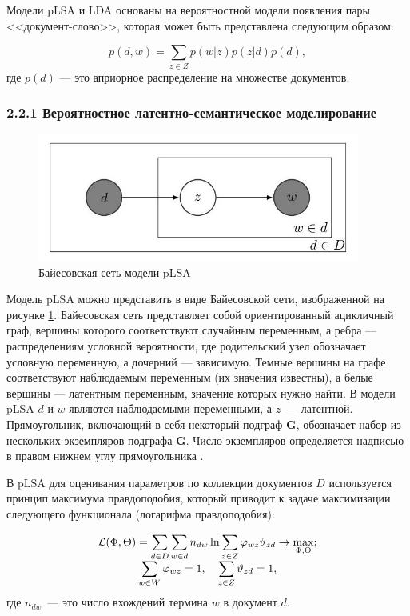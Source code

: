 \documentclass[a4paper]{report}
\begin{document}
	Модели pLSA и LDA основаны на вероятностной модели появления пары <<документ-слово>>,  которая может быть представлена следующим образом:
	
	\begin{equation}
	p(d,w) = \sum_{z \in Z}p(w|z) p(z|d) p(d),
	\label{eq:pmodel}
	\end{equation}
	где $p(d)$ --- это априорное распределение на множестве документов.
	
	
	
	
	
	\subsubsection{2.2.1 Вероятностное латентно-семантическое моделирование}
	\begin{figure}[h]
		\centering
		\includegraphics[width=400px]
		{imgs/PLSA.jpg}
		\caption{Байесовская сеть модели pLSA}
		\label{fig:plsa}
	\end{figure} 
	Модель pLSA можно представить в виде Байесовской сети, изображенной на рисунке \ref{fig:plsa}. Байесовская сеть представляет собой ориентированный ацикличный граф, вершины которого соответствуют случайным переменным, а ребра --- распределениям условной вероятности, где родительский узел обозначает условную переменную, а дочерний --- зависимую. Темные вершины на графе соответствуют наблюдаемым переменным (их значения известны), а белые вершины --- латентным переменным, значение которых нужно найти. В модели pLSA  $d$  и $w$ являются наблюдаемыми переменными, а $z$~--- латентной.  Прямоугольник, включающий в себя некоторый подграф $\mathbf{G}$, обозначает набор из нескольких экземпляров подграфа $\mathbf{G}$. Число экземпляров определяется надписью в правом нижнем углу прямоугольника
	\cite{bib:Heinrich}. 
	
	В pLSA для оценивания параметров по коллекции документов $D$ используется принцип максимума правдоподобия, который приводит к задаче максимизации следующего функционала (логарифма правдоподобия):
	
	\begin{equation}
		\begin{array}{c c}
		\mathcal{L}(\Phi,\Theta) = \mathlarger{ 
			\sum_{d \in D} 
			\sum_{w \in d}
			n_{dw} 
			\ln \sum_{z \in Z}
			\varphi_{wz} \vartheta_{zd} 
			\rightarrow \max_{\Phi, \Theta};
			} \\
		\mathlarger{
			\sum_{w \in W} \varphi_{wz} = 1, \quad \sum_{z \in Z} \vartheta_{zd} = 1,
		}
		\end{array}
	\label{eq:maxtask}
	\end{equation}
	где $n_{dw}$~--- это число вхождений термина $w$ в документ $d$.
	
\end{document}
